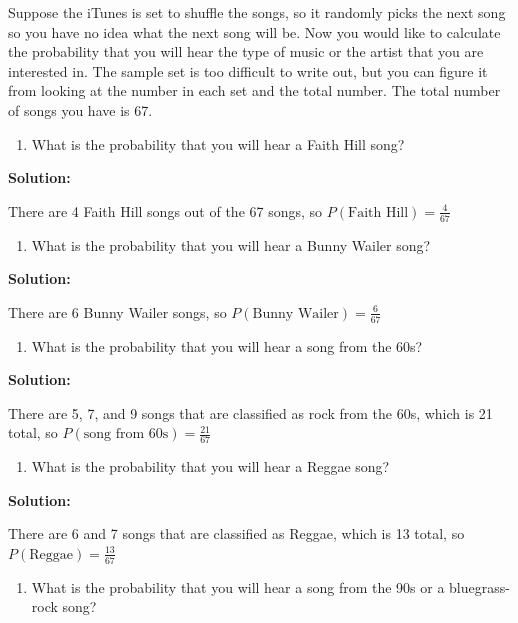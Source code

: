 \documentclass[
]{book}
\providecommand{\tightlist}{%
  \setlength{\itemsep}{0pt}\setlength{\parskip}{0pt}}
\begin{document}
Suppose the iTunes is set to shuffle the songs, so it randomly picks the next song so you have no idea what the next song will be. Now you would like to calculate the probability that you will hear the type of music or the artist that you are interested in. The sample set is too difficult to write out, but you can figure it from looking at the number in each set and the total number. The total number of songs you have is 67.

\begin{enumerate}
\def\labelenumi{\alph{enumi}.}
\tightlist
\item
  What is the probability that you will hear a Faith Hill song?
\end{enumerate}

\textbf{Solution:}

There are 4 Faith Hill songs out of the 67 songs, so \(P(\text{Faith Hill})=\frac{4}{67}\)

\begin{enumerate}
\def\labelenumi{\alph{enumi}.}
\setcounter{enumi}{1}
\tightlist
\item
  What is the probability that you will hear a Bunny Wailer song?
\end{enumerate}

\textbf{Solution:}

There are 6 Bunny Wailer songs, so \(P(\text{Bunny Wailer})=\frac{6}{67}\)

\begin{enumerate}
\def\labelenumi{\alph{enumi}.}
\setcounter{enumi}{2}
\tightlist
\item
  What is the probability that you will hear a song from the 60s?
\end{enumerate}

\textbf{Solution:}

There are 5, 7, and 9 songs that are classified as rock from the 60s, which is 21 total, so \(P(\text{song from 60s})=\frac{21}{67}\)

\begin{enumerate}
\def\labelenumi{\alph{enumi}.}
\setcounter{enumi}{3}
\tightlist
\item
  What is the probability that you will hear a Reggae song?
\end{enumerate}

\textbf{Solution:}

There are 6 and 7 songs that are classified as Reggae, which is 13 total, so \(P(\text{Reggae})=\frac{13}{67}\)

\begin{enumerate}
\def\labelenumi{\alph{enumi}.}
\setcounter{enumi}{4}
\tightlist
\item
  What is the probability that you will hear a song from the 90s or a bluegrass-rock song?
\end{enumerate}
\end{document}
